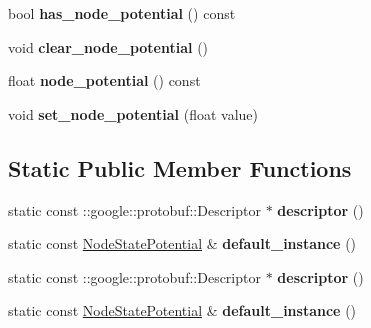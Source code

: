 \begin{DoxyCompactItemize}
\item 
\hypertarget{classgraph_1_1NodeStatePotential_a2ef72c30a1c13aa21170eef7a43bde34}{
bool {\bfseries has\_\-node\_\-potential} () const }
\label{classgraph_1_1NodeStatePotential_a2ef72c30a1c13aa21170eef7a43bde34}

\item 
\hypertarget{classgraph_1_1NodeStatePotential_aac3b8f48c1b6320a6381a16d8743073e}{
void {\bfseries clear\_\-node\_\-potential} ()}
\label{classgraph_1_1NodeStatePotential_aac3b8f48c1b6320a6381a16d8743073e}

\item 
\hypertarget{classgraph_1_1NodeStatePotential_a69e4cc64ea70c2153167a1c0f738bfbd}{
float {\bfseries node\_\-potential} () const }
\label{classgraph_1_1NodeStatePotential_a69e4cc64ea70c2153167a1c0f738bfbd}

\item 
\hypertarget{classgraph_1_1NodeStatePotential_a68c6f680cb958390f116dcabb4c0a007}{
void {\bfseries set\_\-node\_\-potential} (float value)}
\label{classgraph_1_1NodeStatePotential_a68c6f680cb958390f116dcabb4c0a007}

\end{DoxyCompactItemize}
\subsection*{Static Public Member Functions}
\begin{DoxyCompactItemize}
\item 
\hypertarget{classgraph_1_1NodeStatePotential_a376b2186e41466cbaa8dfdb45d5458b0}{
static const ::google::protobuf::Descriptor $\ast$ {\bfseries descriptor} ()}
\label{classgraph_1_1NodeStatePotential_a376b2186e41466cbaa8dfdb45d5458b0}

\item 
\hypertarget{classgraph_1_1NodeStatePotential_a7a7d219bf423b094346b3fd9effb8658}{
static const \hyperlink{classgraph_1_1NodeStatePotential}{NodeStatePotential} \& {\bfseries default\_\-instance} ()}
\label{classgraph_1_1NodeStatePotential_a7a7d219bf423b094346b3fd9effb8658}

\item 
\hypertarget{classgraph_1_1NodeStatePotential_a376b2186e41466cbaa8dfdb45d5458b0}{
static const ::google::protobuf::Descriptor $\ast$ {\bfseries descriptor} ()}
\label{classgraph_1_1NodeStatePotential_a376b2186e41466cbaa8dfdb45d5458b0}

\item 
\hypertarget{classgraph_1_1NodeStatePotential_a7a7d219bf423b094346b3fd9effb8658}{
static const \hyperlink{classgraph_1_1NodeStatePotential}{NodeStatePotential} \& {\bfseries default\_\-instance} ()}
\label{classgraph_1_1NodeStatePotential_a7a7d219bf423b094346b3fd9effb8658}

\end{DoxyCompactItemize}
